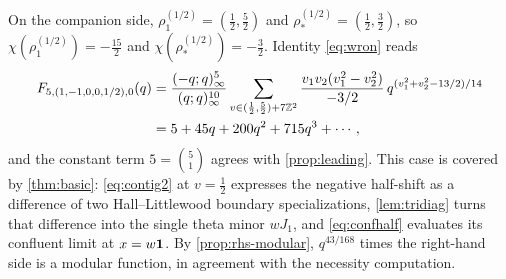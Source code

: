 On the companion side, $\rho^{(1/2)}_1=(\frac12,\frac52)$ and $\rho^{(1/2)}_*=(\frac12,\frac32)$, so $\chi(\rho^{(1/2)}_1)=-\frac{15}2$ and $\chi(\rho^{(1/2)}_*)=-\frac32$. Identity \eqref{eq:wron} reads
\begin{align*}
F_{5,(1,-1,0,0,1/2),0}(q)&=\frac{(-q;q)_\infty^5}{(q;q)_\infty^{10}}\sum_{v\in(\frac12,\frac52)+7\mathbb{Z}^2}\frac{v_1v_2(v_1^2-v_2^2)}{-3/2}\,q^{(v_1^2+v_2^2-13/2)/14}\\
&=5+45q+200q^2+715q^3+\cdots,
\end{align*}
and the constant term $5=\binom{5}{1}$ agrees with \cref{prop:leading}. This case is covered by \cref{thm:basic}: \eqref{eq:contig2} at $v=\frac12$ expresses the negative half-shift as a difference of two Hall--Littlewood boundary specializations, \cref{lem:tridiag} turns that difference into the single theta minor $wJ_1$, and \eqref{eq:confhalf} evaluates its confluent limit at $x=w\mathbf{1}$. By \cref{prop:rhs-modular}, $q^{43/168}$ times the right-hand side is a modular function, in agreement with the necessity computation.
